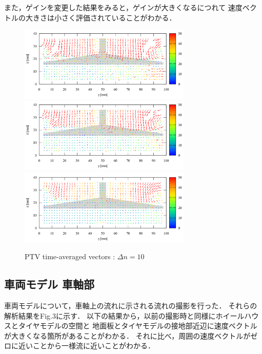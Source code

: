 \documentclass[twocolumn,a4j]{jsarticle}
\begin{document}
また，ゲインを変更した結果をみると，ゲインが大きくなるにつれて
速度ベクトルの大きさは小さく評価されていることがわかる．

\begin{figure}[htbp]
  \footnotesize
  \begin{center}
    \includegraphics[width=82mm]{../images/center_+0.png}
    \includegraphics[width=82mm]{../images/center_+5.png}
    \includegraphics[width=82mm]{../images/center_+10.png}
  \end{center}
  \caption{PTV time-averaged vectors : $\Delta n = 10$}
\end{figure}



\newpage
\subsection{車両モデル 車軸部}
車両モデルについて，車軸上の流れに示される流れの撮影を行った．
それらの解析結果をFig.3に示す．
以下の結果から，以前の撮影時と同様にホイールハウスとタイヤモデルの空間と
地面板とタイヤモデルの接地部近辺に速度ベクトルが大きくなる箇所があることがわかる．
それに比べ，周囲の速度ベクトルがゼロに近いことから一様流に近いことがわかる．
\end{document}
